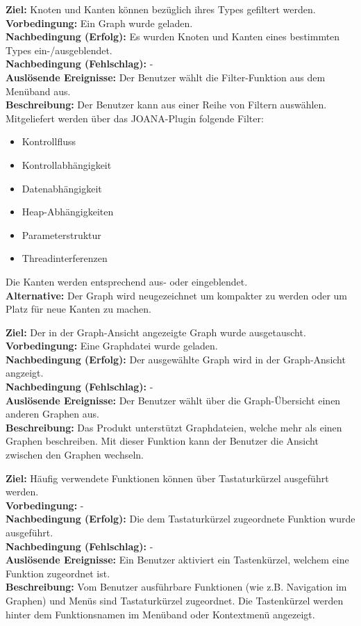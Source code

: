 \label{fa:filter}
\textbf{Ziel:} Knoten und Kanten können bezüglich ihres Types gefiltert werden.\\
\textbf{Vorbedingung:} Ein Graph wurde geladen.\\
\textbf{Nachbedingung (Erfolg):} Es wurden Knoten und Kanten eines bestimmten Types ein-/ausgeblendet.\\
\textbf{Nachbedingung (Fehlschlag):} -\\
\textbf{Auslösende Ereignisse:}
Der Benutzer wählt die Filter-Funktion aus dem Menüband aus.\\
\textbf{Beschreibung:}
Der Benutzer kann aus einer Reihe von Filtern auswählen.
Mitgeliefert werden über das JOANA-Plugin folgende Filter: %
\begin{itemize}[nolistsep]
  \item Kontrollfluss
  \item Kontrollabhängigkeit
  \item Datenabhängigkeit
  \item Heap-Abhängigkeiten
  \item Parameterstruktur
  \item Threadinterferenzen
\end{itemize}
Die Kanten werden entsprechend aus- oder eingeblendet.\\
\textbf{Alternative:}
Der Graph wird neugezeichnet um kompakter zu werden oder um Platz für neue Kanten zu machen.

\label{fa:graphwechsel}
\textbf{Ziel:} Der in der Graph-Ansicht angezeigte Graph wurde ausgetauscht. \\
\textbf{Vorbedingung:} Eine Graphdatei wurde geladen.\\
\textbf{Nachbedingung (Erfolg):} Der ausgewählte Graph wird in der Graph-Ansicht angzeigt.\\
\textbf{Nachbedingung (Fehlschlag):} -\\
\textbf{Auslösende Ereignisse:}
Der Benutzer wählt über die Graph-Übersicht einen anderen Graphen aus.\\
\textbf{Beschreibung:}
Das Produkt unterstützt Graphdateien, welche mehr als einen Graphen beschreiben.
Mit dieser Funktion kann der Benutzer die Ansicht zwischen den Graphen wechseln.

\label{fa:hotkey}
\textbf{Ziel:} Häufig verwendete Funktionen können über Tastaturkürzel ausgeführt werden.\\
\textbf{Vorbedingung:} -\\
\textbf{Nachbedingung (Erfolg):} Die dem Tastaturkürzel zugeordnete Funktion wurde ausgeführt.\\
\textbf{Nachbedingung (Fehlschlag):} -\\
\textbf{Auslösende Ereignisse:}
Ein Benutzer aktiviert ein Tastenkürzel, welchem eine Funktion zugeordnet ist.\\
\textbf{Beschreibung:}
Vom Benutzer ausführbare Funktionen (wie z.B. Navigation im Graphen) und Menüs sind Tastaturkürzel zugeordnet.
Die Tastenkürzel werden hinter dem Funktionsnamen im Menüband oder Kontextmenü angezeigt.


